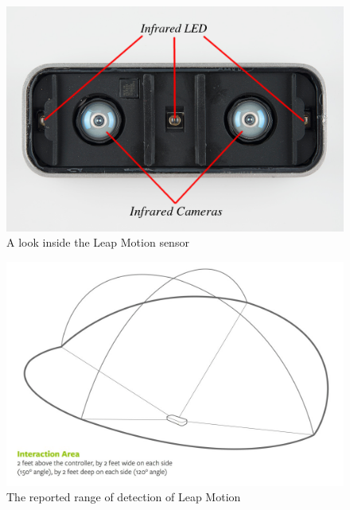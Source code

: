 \documentclass[11pt]{report}
\begin{document}
\begin{center}
	\begin{figure}[H]
		\begin{center}
			\includegraphics[scale=0.8]{pics/leapmotioninternal}
			\caption{A look inside the Leap Motion sensor}
			\label{leapmotioninteral}
		\end{center}
	\end{figure}
\end{center}

\begin{center}
	\begin{figure}[H]
		\begin{center}
			\includegraphics[scale=0.33]{pics/leapmotioninteractionarea}
			\caption{The reported range of detection of Leap Motion}
			\label{leapmotioninteractionarea}
		\end{center}
	\end{figure}
\end{center}
\end{document}
